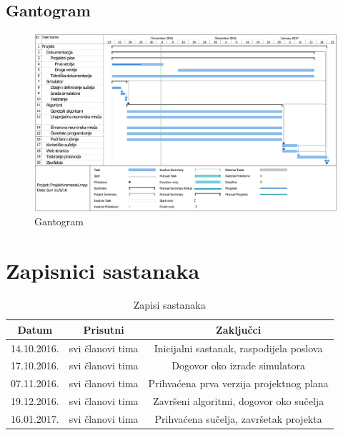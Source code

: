 \documentclass[times, utf8, numeric]{fer}
\begin{document}
\begin{landscape}
\section{Gantogram}
\begin{figure}[H]
\includegraphics[scale=0.725]{ProjektVremenski.pdf}
\caption{Gantogram}
\end{figure}
\end{landscape}

\section{Zapisnici sastanaka}
\begin{table}[H]
\centering
 \begin{tabular}{||c c c||} 
 \hline
 Datum & Prisutni & Zaključci\\ [0.5ex] 
 \hline\hline
 14.10.2016. & svi članovi tima & Inicijalni sastanak, raspodijela poslova\\
 17.10.2016. & svi članovi tima & Dogovor oko izrade simulatora\\
 07.11.2016. & svi članovi tima & Prihvaćena prva verzija projektnog plana\\
 19.12.2016. & svi članovi tima & Završeni algoritmi, dogovor oko sučelja\\
 16.01.2017. & svi članovi tima & Prihvaćena sučelja, završetak projekta\\
 \hline
 \end{tabular}
 \caption{Zapisi sastanaka}
\end{table}
\end{document}
